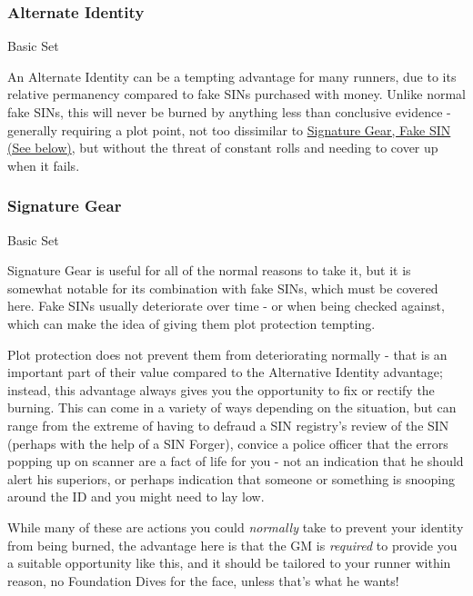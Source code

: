 \begin{multicols}{3}
	\subsubsection*{Alternate Identity}\label{alternate_identity}
	\begin{flushright}
		Basic Set 
	\end{flushright}
	
	An Alternate Identity can be a tempting advantage for many runners, due to its relative permanency compared to fake SINs purchased with money. Unlike normal fake SINs, this will never be burned by anything less than conclusive evidence - generally requiring a plot point, not too dissimilar to \hyperref[signature_gear]{Signature Gear, Fake SIN (See below)}, but without the threat of constant rolls and needing to cover up when it fails.
	
	
	\subsubsection*{Signature Gear}\label{signature_gear}
	\begin{flushright}
		Basic Set 
	\end{flushright}
	
	Signature Gear is useful for all of the normal reasons to take it, but it is somewhat notable for its combination with fake SINs, which must be covered here. Fake SINs usually deteriorate over time - or when being checked against, which can make the idea of giving them plot protection tempting.
	
	Plot protection does not prevent them from deteriorating normally - that is an important part of their value compared to the Alternative Identity advantage; instead, this advantage always gives you the opportunity to fix or rectify the burning. This can come in a variety of ways depending on the situation, but can range from the extreme of having to defraud a SIN registry's review of the SIN (perhaps with the help of a SIN Forger), convice a police officer that the errors popping up on scanner are a fact of life for you - not an indication that he should alert his superiors, or perhaps indication that someone or something is snooping around the ID and you might need to lay low.
	
	While many of these are actions you could \textit{normally} take to prevent your identity from being burned, the advantage here is that the GM is \textit{required} to provide you a suitable opportunity like this, and it should be tailored to your runner within reason, no Foundation Dives for the face, unless that's what he wants!
	

\end{multicols}
